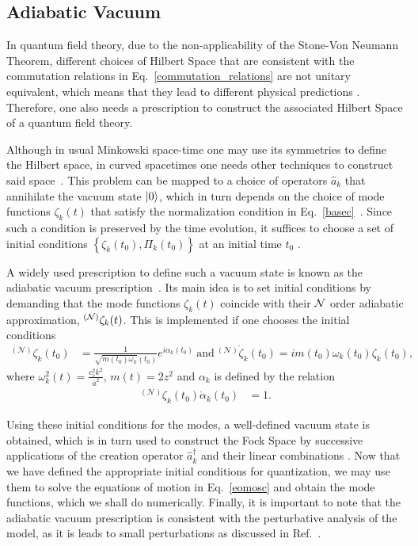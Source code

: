 \documentclass[a4paper,11pt]{article}
\newcommand{\dcha}[1]{\left\{#1 \right\}}
\begin{document}
\subsection{Adiabatic Vacuum}

In quantum field theory, due to the non-applicability of the Stone-Von Neumann Theorem, different choices of Hilbert Space that are consistent with the commutation relations in Eq.~\eqref{commutation_relations} are not unitary equivalent, which means that they lead to different physical predictions \cite{wald1994quantum}. Therefore, one also needs a prescription to construct the associated Hilbert Space of a quantum field theory.

Although in usual Minkowski space-time one may use its symmetries to define the Hilbert space, in curved spacetimes one needs other techniques to construct said space~\cite{birrell1984quantum}. This problem can be mapped to a choice of operators $\hat{a}_{k}$ that annihilate the vacuum state $\ket{0}$, which in turn depends on the choice of mode functions $\zeta_{k}(t)$ that satisfy the normalization condition in Eq.~\eqref{basec}~\cite{mukhanov2007introduction}. Since such a condition is preserved by the time evolution, it suffices to choose a set of initial conditions $\dcha{\zeta_{k}(t_{0}), \Pi_{k}(t_{0})}$ at an initial time $t_{0}$ \cite{vacuum2022}.

A widely used prescription to define such a vacuum state is known as the adiabatic
vacuum prescription~\cite{birrell1984quantum, mukhanov2007introduction}. Its main idea is
to set initial conditions by demanding that the mode functions $\zeta_{k}(t)$ coincide
with their ${\cal N}$ order adiabatic approximation, $^{({\cal N})}\zeta_{k}(t)$. This
is implemented if one chooses the initial conditions~\cite{birrell1984quantum}
\begin{align}
	\label{v_init}
	{ }^{(\mathcal{N})}	\zeta_k(t_0) & = \frac{1}{\sqrt{m(t_0)\omega_k}(t_0)}e^{i\alpha_k(t_0)}~\text{and}~ { }^{(\mathcal{N})}	\dot{\zeta}_k(t_0) = im(t_0)\omega_k(t_0)\zeta_k(t_0)
	,\end{align}
where $\omega_k^2(t) = \frac{c_s^2 k^2}{\bar{a}^2}$, $m(t) = 2z^2$ and $\alpha_k$ is defined by the relation
\begin{align}
	{ }^{(\mathcal{N})}	\zeta_k(t_0) \dot{\alpha}_k(t_0) & = 1.
\end{align}

Using these initial conditions for the modes, a well-defined vacuum state is obtained,
which is in turn used to construct the Fock Space by successive applications of the
creation operator $\hat{a}^{\dagger}_{k}$ and their linear combinations
\cite{mukhanov2007introduction}. Now that we have defined the appropriate initial
conditions for quantization, we may use them to solve the equations of motion in
Eq.~\eqref{eomosc} and obtain the mode functions, which we shall do numerically.
	{\color{red} Finally, it is important to note that the adiabatic vacuum prescription is
		consistent with the perturbative analysis of the model, as it is leads to small
		perturbations as discussed in Ref.~\cite{vitenti2012large}.}
\end{document}
